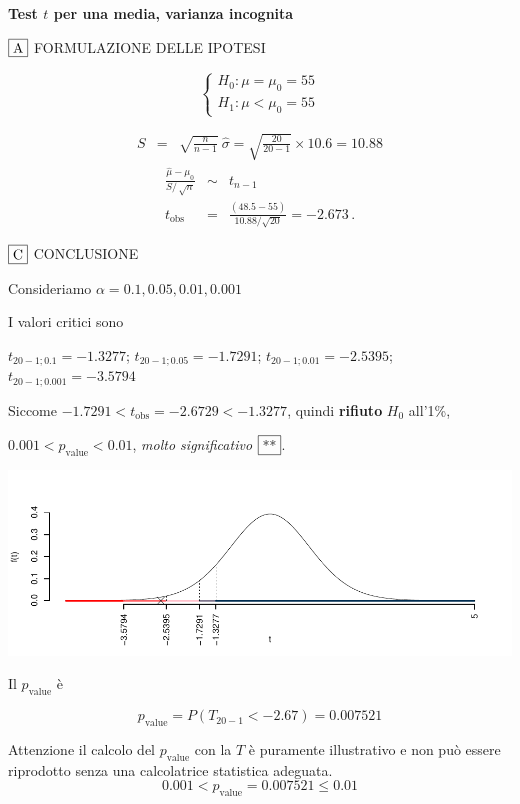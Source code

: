 \documentclass[
  11pt,
]{book}
\theoremstyle{mytheoremstyle}
\theoremstyle{mydefstyle}
\newenvironment{sol}
  {
  \begin{tcolorbox}[enhanced,breakable,arc=0.1mm,boxrule=1pt,colback=white,colframe=iblue,
  title=\bf \fontfamily{lmss}\selectfont \hspace{.5 cm} Soluzione,drop fuzzy shadow]

}{
\end{tcolorbox}
  }
\begin{document}
\begin{sol}
\textbf{Test \(t\) per una media, varianza incognita}

\(\fbox{A}\) FORMULAZIONE DELLE IPOTESI

\[\begin{cases}
   H_0: \mu = \mu_0=55 \\
   H_1: \mu < \mu_0=55 
   \end{cases}\]

\begin{eqnarray*}
   S    &=& \sqrt{\frac{n} {n-1}}\ \widehat{\sigma} 
   =  \sqrt{\frac{ 20 } { 20 -1}} \times  10.6  =  10.88 
   \end{eqnarray*}
\begin{eqnarray*}
   \frac{\hat\mu - \mu_{0}} {S/\,\sqrt{n}}&\sim&t_{n-1}\\
   t_{\text{obs}}
   &=& \frac{ ( 48.5 -  55 )} { 10.88 /\sqrt{ 20 }}
   =   -2.673 \, .
   \end{eqnarray*}

\(\fbox{C}\) CONCLUSIONE

Consideriamo \(\alpha=0.1, 0.05, 0.01, 0.001\)

I valori critici sono

\(t_{20-1;0.1}=-1.3277\); \(t_{20-1;0.05}=-1.7291\); \(t_{20-1;0.01}=-2.5395\); \(t_{20-1;0.001}=-3.5794\)

Siccome \(-1.7291<t_\text{obs}=-2.6729<-1.3277\), quindi \textbf{rifiuto} \(H_0\) all'1\%,

\(0.001<p_\text{value}<0.01\), \emph{molto significativo} \(\fbox{**}\).

\begin{center}\includegraphics{Esami_passati_con_soluzioni_files/figure-latex/05-test-8,-1} \end{center}

Il \(p_{\text{value}}\) è

\[ p_{\text{value}} = P(T_{20-1}<-2.67)=0.007521 \]

Attenzione il calcolo del \(p_\text{value}\) con la \(T\) è puramente illustrativo e non può essere riprodotto senza una calcolatrice statistica adeguata.\[
 0.001 < p_\text{value}= 0.007521 \leq 0.01 
\]

\end{sol}
\end{document}

